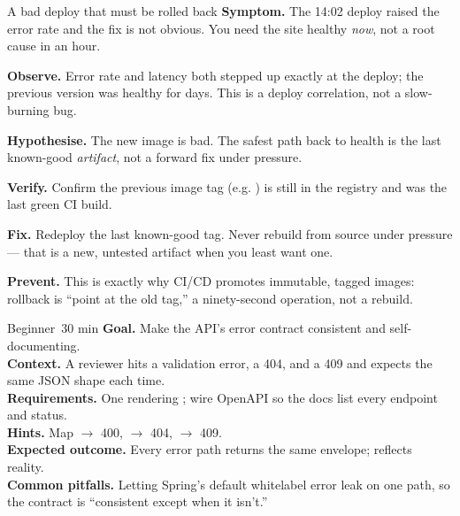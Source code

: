 \begin{debuglab}{A bad deploy that must be rolled back}
\textbf{Symptom.} The 14:02 deploy raised the error rate and the fix is not obvious. You need the site healthy \emph{now}, not a root cause in an hour.

\begin{tickcheck}
  \item \textbf{Observe.} Error rate and latency both stepped up exactly at the deploy; the previous version was healthy for days. This is a deploy correlation, not a slow-burning bug.
  \item \textbf{Hypothesise.} The new image is bad. The safest path back to health is the last known-good \emph{artifact}, not a forward fix under pressure.
  \item \textbf{Verify.} Confirm the previous image tag (e.g. ) is still in the registry and was the last green CI build.
  \item \textbf{Fix.} Redeploy the last known-good tag. Never rebuild from source under pressure --- that is a new, untested artifact when you least want one.
  \item \textbf{Prevent.} This is exactly why CI/CD promotes immutable, tagged images: rollback is ``point at the old tag,'' a ninety-second operation, not a rebuild.
\end{tickcheck}
\end{debuglab}


\begin{minilab}{Beginner}{~30 min}
\textbf{Goal.} Make the API's error contract consistent and self-documenting.\\
\textbf{Context.} A reviewer hits a validation error, a 404, and a 409 and expects the same JSON shape each time.\\
\textbf{Requirements.} One  rendering ; wire OpenAPI so the docs list every endpoint and status.\\
\textbf{Hints.} Map  $\rightarrow$ 400,  $\rightarrow$ 404,  $\rightarrow$ 409.\\
\textbf{Expected outcome.} Every error path returns the same envelope;  reflects reality.\\
\textbf{Common pitfalls.} Letting Spring's default whitelabel error leak on one path, so the contract is ``consistent except when it isn't.''
\end{minilab}

